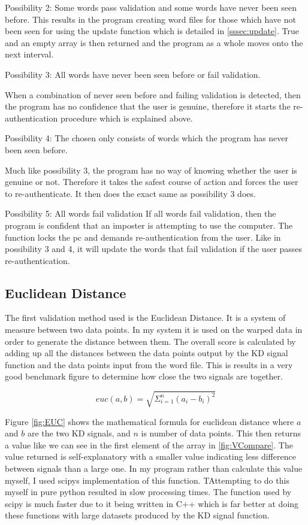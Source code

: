 \documentclass[10pt,a4paper]{report}
\begin{document}
Possibility 2: Some words pass validation and some words have never been seen before.
This results in the program creating word files for those which have not been seen for using the update function which is detailed in \ref{sssec:update}. True and an empty array is then returned and the program as a whole moves onto the next interval.

Possibility 3: All words have never been seen before or fail validation.

When a combination of never seen before and failing validation is detected, then the program has no confidence that the user is genuine, therefore it starts the re-authentication procedure which is explained above.

Possibility 4: The chosen only consists of words which the program has never been seen before.

Much like possibility 3, the program has no way of knowing whether the user is genuine or not. Therefore it takes the safest course of action and forces the user to re-authenticate. It then does the exact same as possibility 3 does.

Possibility 5: All words fail validation
If all words fail validation, then the program is confident that an imposter is attempting to use the computer. The function locks the pc and demands re-authentication from the user. Like in possibility 3 and 4, it will update the words that fail validation if the user passes re-authentication.

\subsection{Euclidean Distance}

The first validation method used is the Euclidean Distance. It is a system of measure between two data points. In my system it is used on the warped data in order to generate the distance between them. The overall score is calculated by adding up all the distances between the data points output by the KD signal function and the data points input from the word file. This is results in a very good benchmark figure to determine how close the two signals are together. 

\begin{equation}
\textit{euc}(a,b) = \sqrt{\Sigma^n_{i=1}(a_i-b_i)^2}
\label{fig:EUC}
\end{equation}

Figure \ref{fig:EUC} shows the mathematical formula for euclidean distance where \(a\) and \(b\) are the two KD signals, and \(n\) is number of data points. This then returns a value like we can see in the first element of the array in \ref{fig:VCompare}. The value returned is self-explanatory with a smaller value indicating less difference between signals than a large one. In my program rather than calculate this value myself, I used scipys implementation of this function\cite{scipycommunity_2022}. TAttempting to do this myself in pure python resulted in slow processing times. The function used by scipy is much faster due to it being written in C++ which is far better at doing these functions with large datasets produced by the KD signal function.
\end{document}
